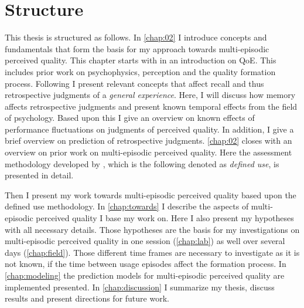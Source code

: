\section{Structure}
This thesis is structured as follows.
In \autoref{chap:02} I introduce concepts and fundamentals that form the basis for my approach towards multi-episodic perceived quality.
This chapter starts with in an introduction on \ac{QoE}.
This includes prior work on psychophysics, perception and the quality formation process.
Following I present relevant concepts that affect recall and thus retrospective judgments of a \emph{general experience}.
Here, I will discuss how memory affects retrospective judgments and present known temporal effects from the field of psychology.
Based upon this I give an overview on known effects of performance fluctuations on judgments of perceived quality.
In addition, I give a brief overview on prediction of retrospective judgments.
\autoref{chap:02} closes with an overview on prior work on multi-episodic perceived quality.
Here the assessment methodology developed by \citet{moller_single-call_2011}, which is the following denoted as \emph{defined use}, is presented in detail.

Then I present my work towards multi-episodic perceived quality based upon the defined use methodology.
In \autoref{chap:towards} I describe the aspects of multi-episodic perceived quality I base my work on.
Here I also present my hypotheses with all necessary details.
Those hypotheses are the basis for my investigations on multi-episodic perceived quality in one session (\autoref{chap:lab}) as well over several days (\autoref{chap:field}).
Those different time frames are necessary to investigate as it is not known, if the time between usage episodes affect the formation process.
In \autoref{chap:modeling} the prediction models for multi-episodic perceived quality are implemented presented.
In \autoref{chap:discussion} I summarize my thesis, discuss results and present directions for future work.